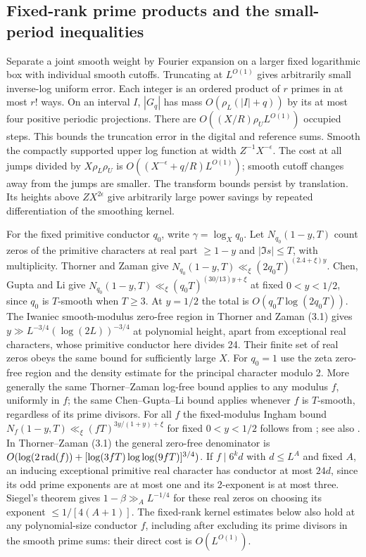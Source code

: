 \documentclass[11pt,a4paper]{article}
\theoremstyle{paperplain}
\numberwithin{equation}{section}
\begin{document}
\subsection{Fixed-rank prime products and the small-period inequalities}
\label{six:fixed-rank-explicit}
Separate a joint smooth weight by Fourier expansion on a larger fixed
logarithmic box with individual smooth cutoffs. Truncating at $L^{O(1)}$
gives arbitrarily small inverse-log uniform error. Each integer is
an ordered product of $r$ primes in at most $r!$ ways. On an
interval $I$, $|G_q|$ has mass $O(\rho_L(|I|+q))$ by its at most
four positive periodic projections. There are
$O((X/R)\rho_U L^{O(1)})$ occupied steps. This bounds the truncation
error in the digital and reference sums. Smooth the compactly supported
upper log function at width $Z^{-1}X^{-\epsilon}$. The cost at all
jumps divided by $X\rho_L\rho_U$ is
$O((X^{-\epsilon}+q/R)L^{O(1)})$; smooth cutoff changes away from
the jumps are smaller. The transform bounds persist by translation.
Its heights above $ZX^{2\epsilon}$ give arbitrarily large power savings
by repeated differentiation of the smoothing kernel.

For the fixed primitive conductor $q_0$, write $\gamma=\log_X q_0$.
Let $N_{q_0}(1-y,T)$ count zeros of the primitive characters
at real part $\ge1-y$ and $|\Im s|\le T$, with multiplicity.
Thorner and Zaman \cite[(2.1)]{ThornerZaman} give
$N_{q_0}(1-y,T)\ll_\xi(2q_0T)^{(2.4+\xi)y}$.
Chen, Gupta and Li \cite[Theorem~1.2]{ChenGuptaLi2026} give $N_{q_0}(1-y,T)\ll_\xi(q_0T)^{(30/13)y+\xi}$
at fixed $0<y<1/2$, since $q_0$ is $T$-smooth when $T\ge3$.
At $y=1/2$ the total is $O(q_0T\log(2q_0T))$.
The Iwaniec smooth-modulus zero-free region in Thorner and Zaman (3.1)
gives $y\gg L^{-3/4}(\log(2L))^{-3/4}$ at polynomial height,
apart from exceptional real characters, whose primitive conductor here
divides 24. Their finite set of real zeros obeys the same bound for
sufficiently large $X$. For $q_0=1$ use the zeta zero-free region and
the density estimate for the principal character modulo 2.
More generally the same Thorner--Zaman log-free bound applies to
any modulus $f$, uniformly in $f$; the same Chen--Gupta--Li bound
applies whenever $f$ is $T$-smooth, regardless of its prime divisors.
For all $f$ the fixed-modulus Ingham bound
$N_f(1-y,T)\ll_\xi(fT)^{3y/(1+y)+\xi}$ for fixed $0<y<1/2$
follows from \cite[(2.5)]{FortiViola1973}; see also \cite[(1.4)]{ChenGuptaLi2026}.
In Thorner--Zaman (3.1) the general zero-free denominator is
$O(\log(2\,{\rm rad}(f))+[\log(3fT)\log\log(9fT)]^{3/4})$.
If $f\mid 6^k d$ with $d\le L^A$ and fixed $A$, an inducing
exceptional primitive real character has conductor at most $24d$,
since its odd prime exponents are at most one and its 2-exponent is
at most three. Siegel's theorem \cite[Theorem~5.28]{IwaniecKowalski2004} gives $1-\beta\gg_A L^{-1/4}$ for
these real zeros on choosing its exponent $\le 1/[4(A+1)]$.
The fixed-rank kernel estimates below also hold at any
polynomial-size conductor $f$, including after excluding its prime
divisors in the smooth prime sums: their direct cost is $O(L^{O(1)})$.
\end{document}
